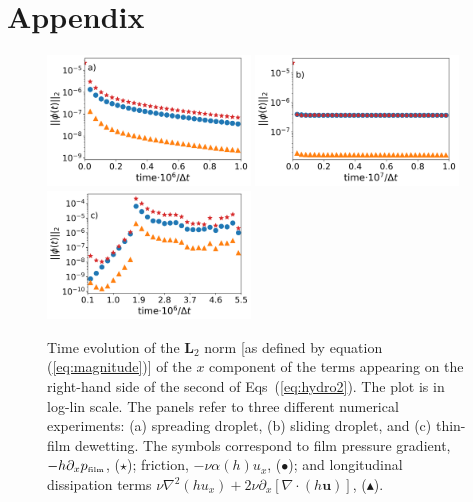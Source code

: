 \section{Appendix}\label{sec:app}
\label{app:only}
\begin{figure}
    \centering
    \includegraphics[width=0.48\textwidth]{graphics/Fig_9_1_Relax_drop_term_analysis_second_revision_without_advec_new.png}
    \includegraphics[width=0.48\textwidth]{graphics/Fig_9_2_moving_drop_term_analysis_smaller_drop_theta_5_better.png}
    \includegraphics[width=0.48\textwidth]{graphics/Fig_9_3_dewetting_term_analysis_no_legend_new_without_advec.png}
    \caption{Time evolution of the $\mathbf{L}_2$ norm [as defined by equation (\ref{eq:magnitude})] of the $x$ component of the terms appearing on the right-hand side of the second of Eqs~(\ref{eq:hydro2}). 
    The plot is in log-lin scale.
    The panels refer to three different numerical experiments: (a) spreading droplet, (b) sliding droplet, and (c) thin-film dewetting. 
    The symbols correspond to film pressure gradient, $-h\partial_x p_{\mbox{\tiny{film}}}$, (\textcolor{pyred}{$\star$}); friction, $-\nu \alpha(h) u_x$, (\textcolor{pyblue}{$\bullet$}); and longitudinal dissipation terms $\nu \nabla^2 (h u_x) + 2\nu \partial_x [\nabla \cdot (h\mathbf{u})]$, (\textcolor{pyorange}{$\blacktriangle$}).}
  \label{fig:Referee_1}
\end{figure}

